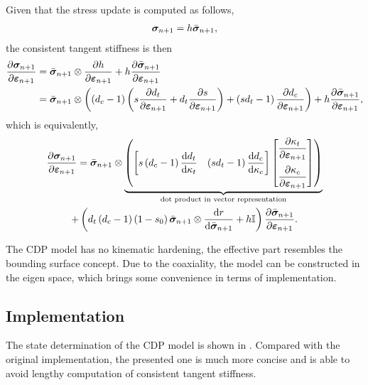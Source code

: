 Given that the stress update is computed as follows,
\begin{gather}
\bm{\sigma}_{n+1}=h\bar{\bm{\sigma}}_{n+1},
\end{gather}
the consistent tangent stiffness is then
\begin{gather}
\begin{split}
\dfrac{\partial{\bm{\sigma}_{n+1}}}{\partial{\bm{\varepsilon}_{n+1}}}&=\bar{\bm{\sigma}}_{n+1}\otimes\dfrac{\partial{h}}{\partial{\bm{\varepsilon}_{n+1}}}+h\dfrac{\partial{\bar{\bm{\sigma}}_{n+1}}}{\partial{\bm{\varepsilon}_{n+1}}}\\
&=\bar{\bm{\sigma}}_{n+1}\otimes\left(\left(d_c-1\right)\left(s\dfrac{\partial{d_t}}{\partial{\bm{\varepsilon}_{n+1}}}+d_t\dfrac{\partial{s}}{\partial{\bm{\varepsilon}_{n+1}}}\right)+\left(sd_t-1\right)\dfrac{\partial{d_c}}{\partial{\bm{\varepsilon}_{n+1}}}\right)+h\dfrac{\partial{\bar{\bm{\sigma}}_{n+1}}}{\partial{\bm{\varepsilon}_{n+1}}},
\end{split}
\end{gather}
which is equivalently,
\begin{multline}\label{eq:cdp_pd}
\dfrac{\partial{\bm{\sigma}_{n+1}}}{\partial{\bm{\varepsilon}_{n+1}}}=\bar{\bm{\sigma}}_{n+1}\otimes\underbrace{\left(\begin{bmatrix}
s\left(d_c-1\right)\dfrac{\mathrm{d}d_t}{\mathrm{d}\kappa_t}&
\left(sd_t-1\right)\dfrac{\mathrm{d}d_c}{\mathrm{d}\kappa_c}
\end{bmatrix}
\begin{bmatrix}
\dfrac{\partial{\kappa_t}}{\partial{\bm{\varepsilon}_{n+1}}}\\[4mm]
\dfrac{\partial{\kappa_c}}{\partial{\bm{\varepsilon}_{n+1}}}
\end{bmatrix}\right)}_\text{dot product in vector representation}\\+\left(d_t\left(d_c-1\right)\left(1-s_0\right)\bar{\bm{\sigma}}_{n+1}\otimes\dfrac{\mathrm{d}r}{\mathrm{d}\bar{\bm{\sigma}}_{n+1}}+h\mathbb{I}\right)\dfrac{\partial{\bar{\bm{\sigma}}_{n+1}}}{\partial{\bm{\varepsilon}_{n+1}}}.
\end{multline}

The CDP model has no kinematic hardening, the effective part resembles the bounding surface concept. Due to the coaxiality, the model can be constructed in the eigen space, which brings some convenience in terms of implementation.
\subsection{Implementation}
The state determination of the CDP model is shown in . Compared with the original implementation, the presented one is much more concise and is able to avoid lengthy computation of consistent tangent stiffness.

